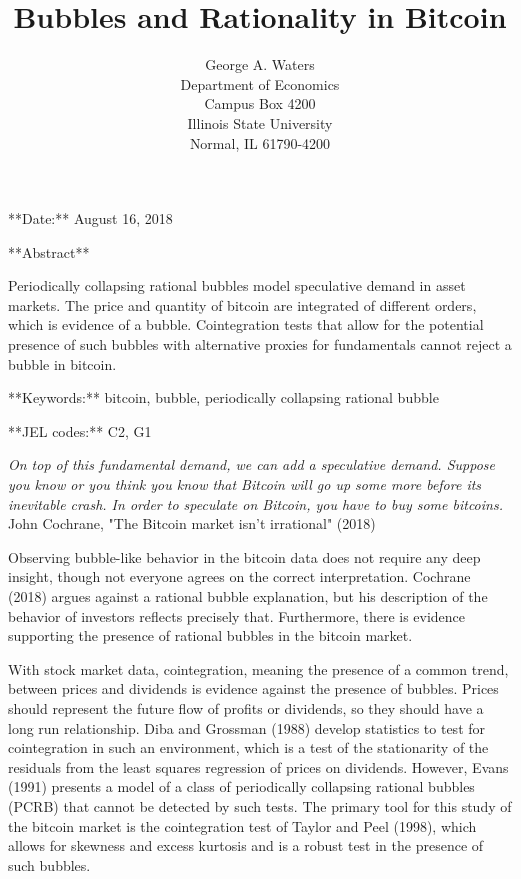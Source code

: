 \documentclass{article}
\begin{document}
\title{Bubbles and Rationality in Bitcoin}
\author{\textsf{George A. Waters} \\
\textsf{Department of Economics}\\
\textsf{Campus Box 4200}\\
\textsf{Illinois State University}\\
\textsf{Normal, IL 61790-4200}}
**Date:** August 16, 2018

**Abstract**

Periodically collapsing rational bubbles model speculative demand in asset
markets. The price and quantity of bitcoin are integrated of different
orders, which is evidence of a bubble. Cointegration tests that allow for
the potential presence of such bubbles with alternative proxies for
fundamentals cannot reject a bubble in bitcoin.

**Keywords:** bitcoin, bubble, periodically collapsing rational bubble

**JEL codes:** C2, G1

\pagebreak

\textit{On top of this fundamental demand, we can add a speculative demand.
Suppose you know or you think you know that Bitcoin will go up some more
before its inevitable crash. In order to speculate on Bitcoin, you have to
buy some bitcoins. }John Cochrane, "The Bitcoin market isn't irrational"
(2018)\bigskip

Observing bubble-like behavior in the bitcoin data does not require any deep
insight, though not everyone agrees on the correct interpretation.
Cochrane (2018) argues against a rational bubble explanation, but his
description of the behavior of investors reflects precisely that.
Furthermore, there is evidence supporting the presence of rational bubbles
in the bitcoin market.

With stock market data, cointegration, meaning the presence of a common
trend, between prices and dividends is evidence against the presence of
bubbles. Prices should represent the future flow of profits or dividends,
so they should have a long run relationship. Diba and Grossman (1988)
develop statistics to test for cointegration in such an environment, which
is a test of the stationarity of the residuals from the least squares
regression of prices on dividends. However, Evans (1991) presents a model
of a class of periodically collapsing rational bubbles (PCRB) that cannot be
detected by such tests. The primary tool for this study of the bitcoin
market is the cointegration test of Taylor and Peel (1998), which allows for
skewness and excess kurtosis and is a robust test in the presence of such
bubbles.
\end{document}
